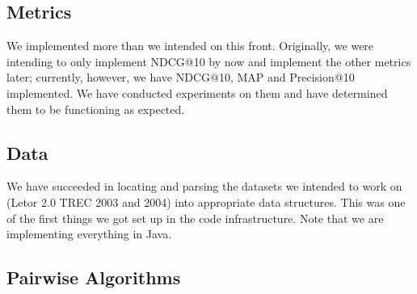 \documentclass{acm_proc_article-sp}
\begin{document}
\subsection{Metrics}

We implemented more than we intended on this front. Originally, we were intending to only implement NDCG@10 by now and implement the other metrics later; currently, however, we have NDCG@10, MAP and Precision@10 implemented. We have conducted experiments on them and have determined them to be functioning as expected. 

\subsection{Data}

We have succeeded in locating and parsing the datasets we intended to work on (Letor 2.0 TREC 2003 and 2004) into appropriate data structures. This was one of the first things we got set up in the code infrastructure. Note that we are implementing everything in Java. 

\subsection{Pairwise Algorithms}
\end{document}
